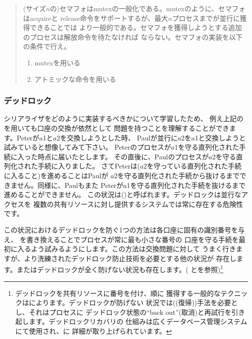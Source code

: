 \begin{quote}
(サイズ\( n \)の)セマフォはmutexの一般化である。mutexのように、セマフォはacquireと
release命令をサポートするが、最大\( n \)プロセスまでが並行に獲得できることでは
より一般的である。セマフォを獲得しようとする追加のプロセスは解放命令を待たなければ
ならない。セマフォの実装を以下の条件で行え。

\begin{enumerate}[a]

\item
mutexを用いる

\item
アトミックな命令を用いる

\end{enumerate}
\end{quote}

\subsubsection*{デッドロック}



シリアライザをどのように実装するべきかについて学習したため、
例え上記のを用いても口座の交換が依然として
問題を持つことを理解することができます。Peterが\( a \)1と\( a \)2を交換しようとした時、
Paulが並行に\( a \)2を\( a \)1と交換しようと試みていると想像してみて下さい。
Peterのプロセスが\( a \)1を守る直列化された手続に入った時点に届いたとします。
その直後に、Paulのプロセスが\( a \)2を守る直列化された手続に入りました。
さてPeterは(\( a \)2を守っている直列化された手続に入ること)を進めることはPaulが
\( a \)2を守る直列化された手続から抜けるまでできません。同様に、Paulもまた
Peterが\( a \)1を守る直列化された手続を抜けるまで進めることができません。
この状況は()と呼ばれます。デッドロックは並行なアクセスを
複数の共有リソースに対し提供するシステムでは常に存在する危険性です。



この状況におけるデッドロックを防ぐ1つの方法は各口座に固有の識別番号を与え、
を書き換えることでプロセスが常に最も小さな番号の
口座を守る手続を最初に入るよう試みるようにします。この方法は交換問題に対して
うまく行きますが、より洗練されたデッドロック防止技術を必要とする他の状況が
存在します。またはデッドロックが全く防げない状況も存在します。( 
とを参照)\footnote{デッドロックを共有リソースに番号を付け、順に
獲得する一般的なテクニックはによります。デッドロックが防げない
状況では((復帰))手法を必要とし、それはプロセスに
デッドロック状態の``back out''(取消)と再試行を引き起します。デッドロックリカバリの
仕組みは広くデータベース管理システムにて使用され、に
詳細が取り上げられています。}

